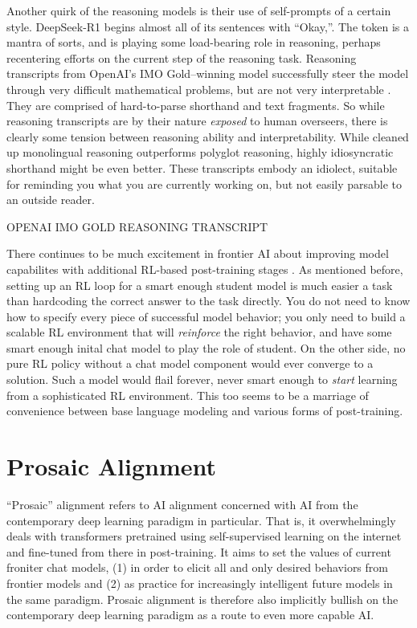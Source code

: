Another quirk of the reasoning models is their use of self-prompts of a certain
style. DeepSeek-R1 begins almost all of its sentences with ``Okay,''. The token
is a mantra of sorts, and is playing some load-bearing role in reasoning,
perhaps recentering efforts on the current step of the reasoning task.
Reasoning transcripts from OpenAI's IMO Gold--winning model successfully steer
the model through very difficult mathematical problems, but are not very
interpretable \cite{}. They are comprised of hard-to-parse shorthand and text
fragments. So while reasoning transcripts are by their nature \emph{exposed} to
human overseers, there is clearly some tension between reasoning ability and
interpretability. While cleaned up monolingual reasoning outperforms polyglot
reasoning, highly idiosyncratic shorthand might be even better. These
transcripts embody an idiolect, suitable for reminding you what you are
currently working on, but not easily parsable to an outside reader.

OPENAI IMO GOLD REASONING TRANSCRIPT

There continues to be much excitement in frontier AI about improving model
capabilites with additional RL-based post-training stages
\cite{silver2025experience}. As mentioned before, setting up an RL loop for a
smart enough student model is much easier a task than hardcoding the correct
answer to the task directly. You do not need to know how to specify every piece
of successful model behavior; you only need to build a scalable RL environment
that will \emph{reinforce} the right behavior, and have some smart enough
inital chat model to play the role of student. On the other side, no pure RL
policy without a chat model component would ever converge to a solution. Such a
model would flail forever, never smart enough to \emph{start} learning from a
sophisticated RL environment. This too seems to be a marriage of convenience
between base language modeling and various forms of post-training.

\section{Prosaic Alignment}
``Prosaic'' alignment refers to AI alignment concerned with AI from the
contemporary deep learning paradigm in particular. That is, it overwhelmingly
deals with transformers pretrained using self-supervised learning on the
internet and fine-tuned from there in post-training. It aims to set the values
of current froniter chat models, (1) in order to elicit all and only desired
behaviors from frontier models and (2) as practice for increasingly intelligent
future models in the same paradigm. Prosaic alignment is therefore also
implicitly bullish on the contemporary deep learning paradigm as a route to
even more capable AI.

